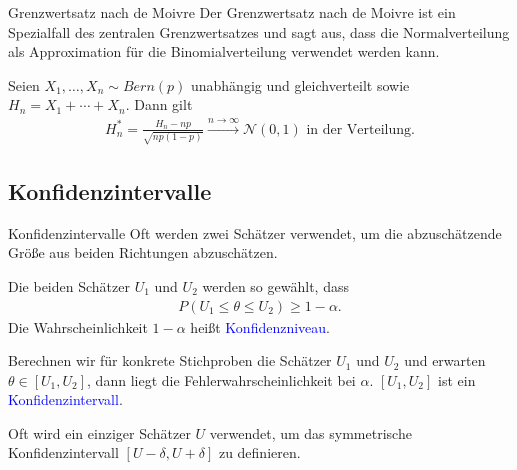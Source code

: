 \documentclass{beamer}
\def\padding{\vspace{0.5cm}}
\def\spadding{\vspace{0.25cm}}
\def\b{\textcolor{blue}}
\begin{document}
\begin{frame}
    \begin{block}{Grenzwertsatz nach de Moivre}
        Der Grenzwertsatz nach de Moivre ist ein Spezialfall des zentralen Grenzwertsatzes und sagt aus, dass die Normalverteilung als Approximation für die Binomialverteilung verwendet werden kann.\pause\par\spadding
        Seien $X_1, \dots, X_n \sim Bern(p)$ unabhängig und gleichverteilt sowie $H_n = X_1 + \cdots + X_n$. Dann gilt
        \begin{align*}
            H_n^* = \frac{H_n - n p}{\sqrt{n p (1 - p)}} \xrightarrow{n \to \infty} \mathcal{N}(0,1) \text{ in der Verteilung}.
        \end{align*}
    \end{block}
\end{frame}

\subsection{Konfidenzintervalle}
\begin{frame}{Konfidenzintervalle}
    Oft werden zwei Schätzer verwendet, um die abzuschätzende Größe aus beiden Richtungen abzuschätzen.\pause\par
    Die beiden Schätzer $U_1$ und $U_2$ werden so gewählt, dass
    \begin{align*}
        P(U_1 \leq \theta \leq U_2) \geq 1 - \alpha.
    \end{align*}\pause
    Die Wahrscheinlichkeit $1 - \alpha$ heißt \b{Konfidenzniveau}.\pause\par\padding
    Berechnen wir für konkrete Stichproben die Schätzer $U_1$ und $U_2$ und erwarten $\theta \in [U_1, U_2]$, dann liegt die Fehlerwahrscheinlichkeit bei $\alpha$. $[U_1, U_2]$ ist ein \b{Konfidenzintervall}.\pause\par\spadding
    Oft wird ein einziger Schätzer $U$ verwendet, um das symmetrische Konfidenzintervall $[U - \delta, U + \delta]$ zu definieren.
\end{frame}
\end{document}
